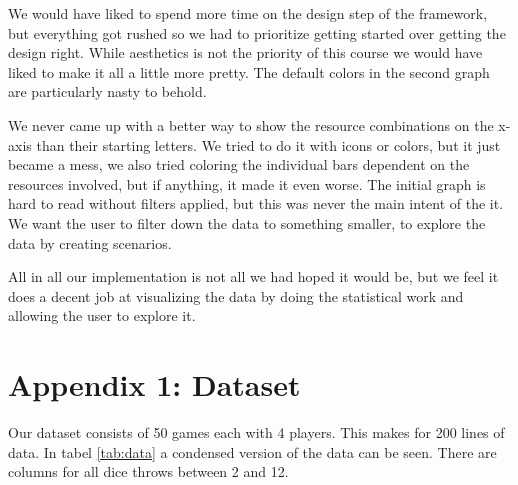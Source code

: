\documentclass[journal]{vgtc}                %
\begin{document}
We would have liked to spend more time on the design step of the framework,
but everything got rushed so we had to prioritize getting started over getting
the design right. While aesthetics is not the priority of this course we would
have liked to make it all a little more pretty. The default colors in the
second graph are particularly nasty to behold.

We never came up with a better way to show the resource combinations on
the x-axis than their starting letters. We tried to do it with icons or
colors, but it just became a mess, we also tried coloring the individual
bars dependent on the resources involved, but if anything, it made it even
worse. The initial graph is hard to read without filters applied, but this was
never the main intent of the it. We want the user to filter down the data to
something smaller, to explore the data by creating scenarios.

All in all our implementation is not all we had hoped it would be, but we feel
it does a decent job at visualizing the data by doing the statistical work and
allowing the user to explore it.


%

%
%
%



\appendix
\newpage
\section{Appendix 1: Dataset}

Our dataset consists of 50 games each with 4 players. This makes for 200 lines
of data. In tabel \ref{tab:data} a condensed version of the data can be seen.
There are columns for all dice throws between 2 and 12.
\end{document}
